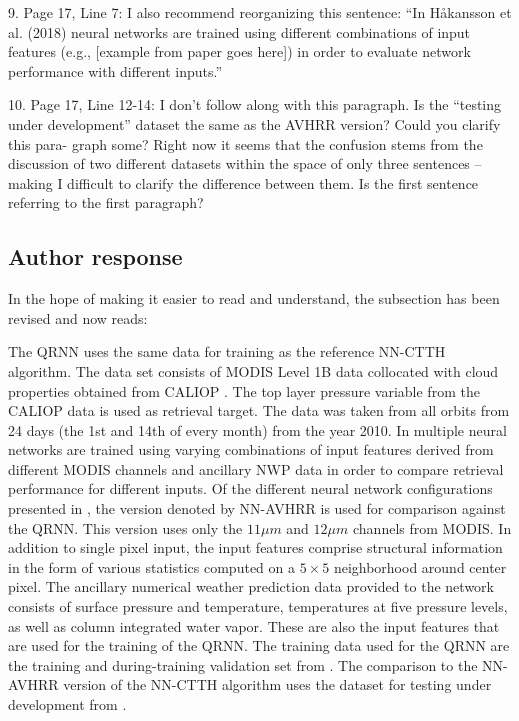 \documentclass[journal abbreviation, manuscript]{copernicus}
\begin{document}
9.  Page 17, Line 7:  I also recommend reorganizing this sentence:  “In Håkansson et
al.  (2018) neural networks are trained using different combinations of input features
(e.g., [example from paper goes here]) in order to evaluate network performance with
different inputs.”


10. Page 17, Line 12-14: I don’t follow along with this paragraph. Is the “testing under
development” dataset the same as the AVHRR version?  Could you clarify this para-
graph some?  Right now it seems that the confusion stems from the discussion of two
different datasets within the space of only three sentences – making I difficult to clarify
the difference between them. Is the first sentence referring to the first paragraph?

\subsection*{Author response}

In the hope of making it easier to read and understand, the subsection has been
revised and now reads:

\vspace{0.5em}

\begin{em}
The QRNN uses the same data for training as the reference NN-CTTH algorithm. The
data set consists of MODIS Level 1B data \citep{myd021km, myd03} collocated with
cloud properties obtained from CALIOP \citep{calipso}. The top layer
  pressure variable from the CALIOP data is used as retrieval target. The data
was taken from all orbits from 24 days (the 1st and 14th of every month) from
the year 2010. In \citet{hakansson} multiple neural networks are trained using
varying combinations of input features derived from different MODIS channels and
ancillary NWP data in order to compare retrieval performance for different
inputs. Of the different neural network configurations presented in
\citet{hakansson}, the version denoted by NN-AVHRR is used for comparison
against the QRNN. This version uses only the $11 \unit{\mu m}$ and $12\unit{\mu
  m}$ channels from MODIS. In addition to single pixel input, the input features
comprise structural information in the form of various statistics computed on a
$5 \times 5$ neighborhood around center pixel. The ancillary numerical weather
prediction data provided to the network consists of surface pressure and
temperature, temperatures at five pressure levels, as well as column integrated
water vapor. These are also the input features that are used for the training of
the QRNN. The training data used for the QRNN are the training and
during-training validation set from \citet{hakansson}. The comparison to
the NN-AVHRR version of the NN-CTTH algorithm uses the dataset for
testing under development from \cite{hakansson}.
\end{em}
\end{document}
